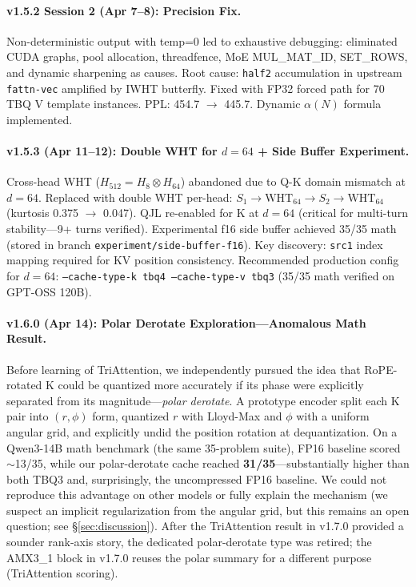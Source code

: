 \documentclass[10pt,twocolumn]{article}
\begin{document}
\paragraph{v1.5.2 Session 2 (Apr 7--8): Precision Fix.}
Non-deterministic output with temp=0 led to exhaustive debugging: eliminated CUDA graphs, pool allocation, threadfence, MoE MUL\_MAT\_ID, SET\_ROWS, and dynamic sharpening as causes. Root cause: \texttt{half2} accumulation in upstream \texttt{fattn-vec} amplified by IWHT butterfly. Fixed with FP32 forced path for 70 TBQ V template instances. PPL: 454.7 $\to$ 445.7. Dynamic $\alpha(N)$ formula implemented.

\paragraph{v1.5.3 (Apr 11--12): Double WHT for $d=64$ + Side Buffer Experiment.}
Cross-head WHT ($H_{512} = H_8 \otimes H_{64}$) abandoned due to Q-K domain mismatch at $d=64$. Replaced with double WHT per-head: $S_1 \to \text{WHT}_{64} \to S_2 \to \text{WHT}_{64}$ (kurtosis 0.375 $\to$ 0.047). QJL re-enabled for K at $d=64$ (critical for multi-turn stability---9+ turns verified). Experimental f16 side buffer achieved 35/35 math (stored in branch \texttt{experiment/side-buffer-f16}). Key discovery: \texttt{src1} index mapping required for KV position consistency. Recommended production config for $d=64$: \texttt{--cache-type-k tbq4 --cache-type-v tbq3} (35/35 math verified on GPT-OSS 120B).

\paragraph{v1.6.0 (Apr 14): Polar Derotate Exploration---Anomalous Math Result.}
Before learning of TriAttention, we independently pursued the idea that RoPE-rotated K could be quantized more accurately if its phase were explicitly separated from its magnitude---\emph{polar derotate}. A prototype encoder split each K pair into $(r, \phi)$ form, quantized $r$ with Lloyd-Max and $\phi$ with a uniform angular grid, and explicitly undid the position rotation at dequantization. On a Qwen3-14B math benchmark (the same 35-problem suite), FP16 baseline scored $\sim$13/35, while our polar-derotate cache reached \textbf{31/35}---substantially higher than both TBQ3 and, surprisingly, the uncompressed FP16 baseline. We could not reproduce this advantage on other models or fully explain the mechanism (we suspect an implicit regularization from the angular grid, but this remains an open question; see \S\ref{sec:discussion}). After the TriAttention result in v1.7.0 provided a sounder rank-axis story, the dedicated polar-derotate type was retired; the AMX3\_1 block in v1.7.0 reuses the polar summary for a different purpose (TriAttention scoring).
\end{document}
